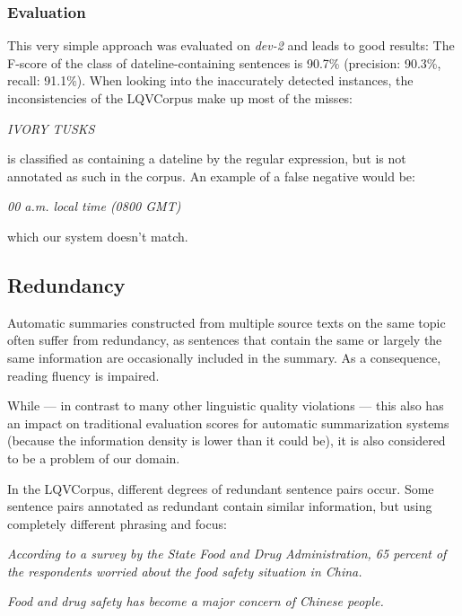 \documentclass[a4paper,10pt]{scrartcl}
\theoremstyle{style}
\begin{document}
\subsubsection{Evaluation}
This very simple approach was evaluated on \textit{dev-2} and leads to good results: The F-score of the class of dateline-containing sentences is 90.7\% (precision: 90.3\%, recall: 91.1\%). When looking into the inaccurately detected instances, the inconsistencies of the LQVCorpus make up most of the misses:


\textit{IVORY TUSKS}

is classified as containing a dateline by the regular expression, but is not annotated as such in the corpus. An example of a false negative would be:

\textit{00 a.m. local time (0800 GMT)}

which our system doesn't match.

\subsection{Redundancy}
\label{redundancy}

Automatic summaries constructed from multiple source texts on the same topic often suffer from redundancy, as sentences that contain the same or largely the same information are occasionally included in the summary. As a consequence, reading fluency is impaired.

While --- in contrast to many other linguistic quality violations --- this also has an impact on traditional evaluation scores for automatic summarization systems (because the information density is lower than it could be), it is also considered to be a problem of our domain.

In the LQVCorpus, different degrees of redundant sentence pairs occur. Some sentence pairs annotated as redundant contain similar information, but using completely different phrasing and focus:

\textit{According to a survey by the State Food and Drug Administration, 65 percent of the respondents worried about the food safety situation in China.}

\textit{Food and drug safety has become a major concern of Chinese people.}
\end{document}
